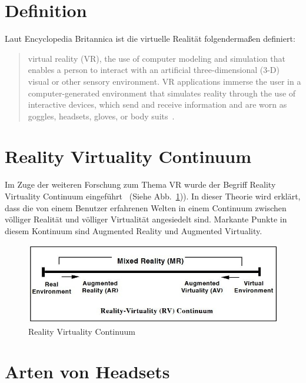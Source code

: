 \section{Definition}
\label{sec:definition}

Laut Encyclopedia Britannica ist die virtuelle Realität folgendermaßen definiert:
\begin{quotation}
    virtual reality (VR), the use of computer modeling and simulation that enables a person to interact with an artificial three-dimensional (3-D) visual or other sensory environment.
    VR applications immerse the user in a computer-generated environment that simulates reality through the use of interactive devices, which send and receive information and are worn as goggles, headsets, gloves, or body suits~\cite{LOWOOD_2021}.
\end{quotation}

\section{Reality Virtuality Continuum}
\label{sec:reality-virtuality-continuum}

Im Zuge der weiteren Forschung zum Thema VR wurde der Begriff Reality Virtuality Continuum eingeführt~\cite{MILGRAM_1994} (Siehe Abb.~\ref{fig:reality_virtuality_continuum})).
In dieser Theorie wird erklärt, dass die von einem Benutzer erfahrenen Welten in einem Continuum zwischen völliger Realität und völliger Virtualität angesiedelt sind.
Markante Punkte in diesem Kontinuum sind Augmented Reality und Augmented Virtuality.

\begin{figure}
    \centering
    \includegraphics[scale=0.5]{pics/reality_virtuality_continuum}
    \caption{Reality Virtuality Continuum}
    \label{fig:reality_virtuality_continuum}
\end{figure}

\section{Arten von Headsets}

